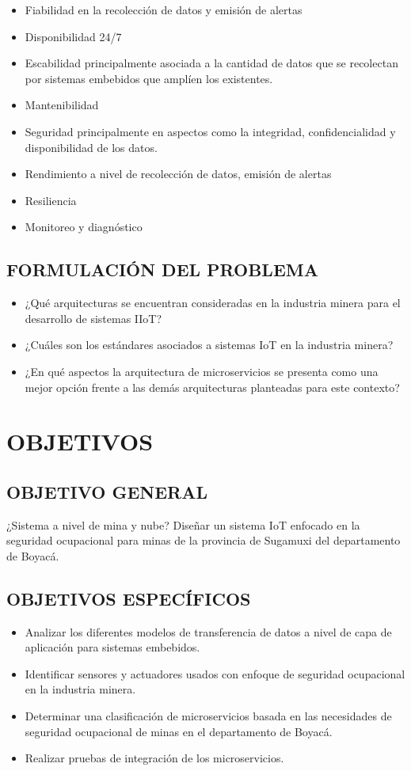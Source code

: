 \documentclass[stu,12pt,floatsintext]{apa7}
\begin{document}
	\begin{itemize}
		\item Fiabilidad en la recolección de datos y emisión de alertas
		\item Disponibilidad 24/7
		\item Escabilidad principalmente asociada a la cantidad de datos que se recolectan por sistemas embebidos que amplíen los existentes.
		\item Mantenibilidad
		\item Seguridad principalmente en aspectos como la integridad, confidencialidad y disponibilidad de los datos.
		\item Rendimiento a nivel de recolección de datos, emisión de alertas
		\item Resiliencia 
		\item Monitoreo y diagnóstico
	\end{itemize}
	\subsection{FORMULACIÓN DEL PROBLEMA}
	\begin{itemize}
		   \item ¿Qué arquitecturas se encuentran consideradas en la industria minera para el desarrollo de sistemas IIoT?
		   \item ¿Cuáles son los estándares asociados a sistemas IoT en la industria minera?
			\item ¿En qué aspectos la arquitectura de microservicios se presenta como una mejor opción frente a las demás arquitecturas planteadas para este contexto?
	\end{itemize}
	
	\section{OBJETIVOS}
	\subsection{OBJETIVO GENERAL}
	¿Sistema a nivel de mina y nube?
	Diseñar un sistema IoT enfocado en la seguridad ocupacional para minas de la provincia de Sugamuxi del departamento de Boyacá.
	\subsection{OBJETIVOS ESPECÍFICOS}
	\begin{itemize}
		\item Analizar los diferentes modelos de transferencia de datos a nivel de capa de aplicación para sistemas embebidos.
		\item Identificar sensores y actuadores usados con enfoque de seguridad ocupacional en la industria minera.
		\item Determinar una clasificación de microservicios basada en las necesidades de seguridad ocupacional de minas en el departamento de Boyacá.
		\item Realizar pruebas de integración de los microservicios.
	\end{itemize}
\end{document}
